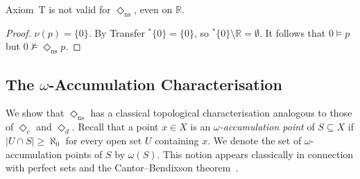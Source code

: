 \documentclass[submission,copyright,creativecommons]{eptcs}
\newcommand{\diam}{\Diamond}
\newcommand{\str}{{{}^{*}\!}}
\newcommand{\lozengens}{\diam_\mathrm{ns}}
\begin{document}
\begin{proposition}
\label{prop:nsrefl}
Axiom~T is not valid for $\lozengens$, even on $\mathbb{R}$.
\end{proposition}

\begin{proof}
$\nu(p) = \{0\}$. 
By Transfer $\str\{0\} = \{0\}$, so $\str\{0\} \setminus \mathbb{R} = \emptyset$.
It follows that $0 \models p$ but $0 \not\models \lozengens p$.
\end{proof}

\subsection{The \texorpdfstring{$\omega$}{omega}-Accumulation Characterisation}

We show that $\lozengens$ has a classical topological characterisation analogous to those of $\diam_c$ and $\diam_d$.
Recall that a point $x \in X$ is an \emph{$\omega$-accumulation point} of $S \subseteq X$ if $|U \cap S| \geq \aleph_0$ for every open set $U$ containing $x$.
We denote the set of $\omega$-accumulation points of $S$ by $\omega(S)$.
This notion appears classically in connection with perfect sets and the Cantor--Bendixson theorem~\cite{Kechris1995}.

\end{document}
